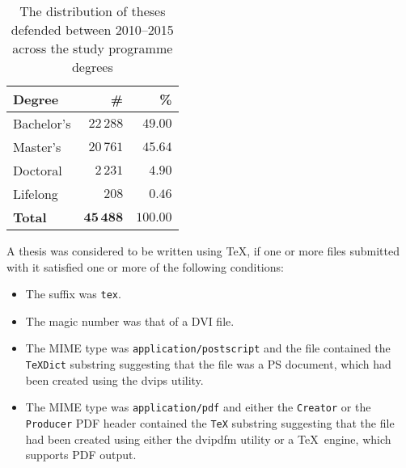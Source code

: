 \documentclass[12pt]{article}
\begin{document}
\begin{frame}
  \begin{table}[!b]
    \begin{tabularx}{\textwidth}{Xrr}
      \textbf{Degree} & \textbf{\#} & \textbf{\%} \\
      \toprule
      Bachelor's & $22\,288$ & $49.00$ \\
      Master's   & $20\,761$ & $45.64$ \\
      Doctoral   &  $2\,231$ &  $4.90$ \\
      Lifelong   &     $208$ &  $0.46$ \\
      \bottomrule
      \textbf{Total} & $\mathbf{45\,488}$ & $\mathbf{100.00}$
    \end{tabularx}
    \caption{The distribution of theses defended between 2010--2015
      across the study programme degrees}
  \end{table}
\end{frame}\begin{frame}
  A thesis was considered to be written using \TeX, if one
  or more files submitted with it satisfied one or more of the
  following conditions: \begin{itemize}
    \item The suffix was \texttt{tex}.
    \item The magic number was that of a DVI file.
    \item The MIME type was \texttt{application/postscript} and
      the file contained the \texttt{TeXDict} substring suggesting
      that the file was a PS document, which had been created
      using the \textsf{dvips} utility.
    \item The MIME type was \texttt{application/pdf} and either
      the \texttt{Creator} or the \texttt{Producer} PDF 
      header contained the \texttt{TeX} substring suggesting that
      the file had been created using either the \textsf{dvipdfm}
      utility or a \TeX\ engine, which supports PDF output.
  \end{itemize}
\end{frame}
\end{document}
